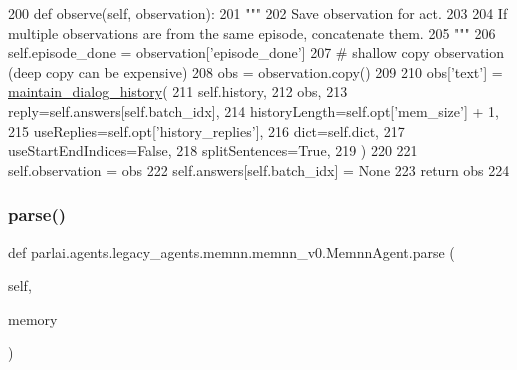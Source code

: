 \begin{DoxyCode}
200     \textcolor{keyword}{def }observe(self, observation):
201         \textcolor{stringliteral}{"""}
202 \textcolor{stringliteral}{        Save observation for act.}
203 \textcolor{stringliteral}{}
204 \textcolor{stringliteral}{        If multiple observations are from the same episode, concatenate them.}
205 \textcolor{stringliteral}{        """}
206         self.episode\_done = observation[\textcolor{stringliteral}{'episode\_done'}]
207         \textcolor{comment}{# shallow copy observation (deep copy can be expensive)}
208         obs = observation.copy()
209 
210         obs[\textcolor{stringliteral}{'text'}] = \hyperlink{namespaceparlai_1_1agents_1_1legacy__agents_1_1seq2seq_1_1utils__v0_ac7cb3ffae208474d6e67f37ecfe07f64}{maintain\_dialog\_history}(
211             self.history,
212             obs,
213             reply=self.answers[self.batch\_idx],
214             historyLength=self.opt[\textcolor{stringliteral}{'mem\_size'}] + 1,
215             useReplies=self.opt[\textcolor{stringliteral}{'history\_replies'}],
216             dict=self.dict,
217             useStartEndIndices=\textcolor{keyword}{False},
218             splitSentences=\textcolor{keyword}{True},
219         )
220 
221         self.observation = obs
222         self.answers[self.batch\_idx] = \textcolor{keywordtype}{None}
223         \textcolor{keywordflow}{return} obs
224 
\end{DoxyCode}
\mbox{\label{classparlai_1_1agents_1_1legacy__agents_1_1memnn_1_1memnn__v0_1_1MemnnAgent_a5e9b6393cb251b6030bb9a0db51b8026}} 
\subsubsection{\texorpdfstring{parse()}{parse()}}
{\footnotesize\ttfamily def parlai.\+agents.\+legacy\+\_\+agents.\+memnn.\+memnn\+\_\+v0.\+Memnn\+Agent.\+parse (\begin{DoxyParamCaption}\item[{}]{self,  }\item[{}]{memory }\end{DoxyParamCaption})}

